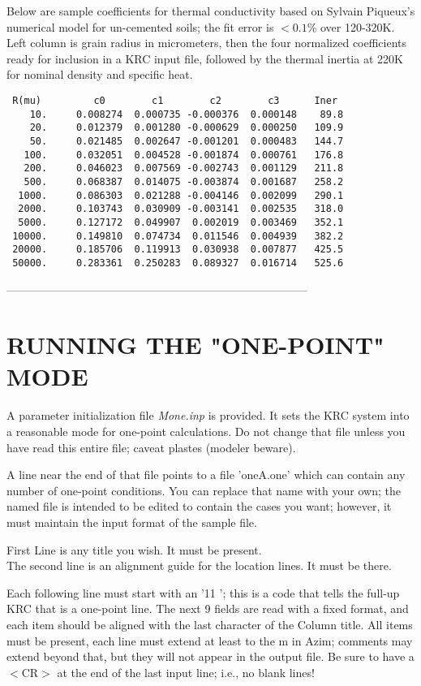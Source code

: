 \documentclass[draft]{article}  %
\newcommand{\nf}{\textit}  %
\begin{document}
Below are sample coefficients for thermal conductivity based on Sylvain
Piqueux's numerical model for un-cemented soils; the fit error is $<0.1$\% over
120-320K. Left column is grain radius in micrometers, then the four normalized
coefficients ready for inclusion in a KRC input file, followed by the thermal
inertia at 220K for nominal density and specific heat.
\vspace{-3.mm} 
\begin{verbatim}
 R(mu)         c0        c1        c2        c3      Iner  
    10.     0.008274  0.000735 -0.000376  0.000148    89.8 
    20.     0.012379  0.001280 -0.000629  0.000250   109.9 
    50.     0.021485  0.002647 -0.001201  0.000483   144.7 
   100.     0.032051  0.004528 -0.001874  0.000761   176.8 
   200.     0.046023  0.007569 -0.002743  0.001129   211.8 
   500.     0.068387  0.014075 -0.003874  0.001687   258.2 
  1000.     0.086303  0.021288 -0.004146  0.002099   290.1 
  2000.     0.103743  0.030909 -0.003141  0.002535   318.0 
  5000.     0.127172  0.049907  0.002019  0.003469   352.1 
 10000.     0.149810  0.074734  0.011546  0.004939   382.2 
 20000.     0.185706  0.119913  0.030938  0.007877   425.5 
 50000.     0.283361  0.250283  0.089327  0.016714   525.6 
\end{verbatim}


--------------------------------------------------------------------------------

 \section{RUNNING THE "ONE-POINT" MODE} %

A parameter initialization file   \nf{Mone.inp}  is provided. It sets the KRC 
system into a reasonable mode for one-point calculations. Do not change that 
file unless you have read this entire file; caveat plastes (modeler beware).

A line near the end of that file points to a file 'oneA.one' which can contain
any number of one-point conditions. You can replace that name with your own; the
named file is intended to be edited to contain the cases you want; however, it
must maintain the input format of the sample file.

First Line is any title you wish. It must be present. \\
The second line is an alignment guide for the location lines. It must be there.

Each following line must start with an '11 '; this is a code that tells the
full-up KRC that is a one-point line. The next 9 fields are read with a fixed
format, and each item should be aligned with the last character of the Column
title. All items must be present, each line must extend at least to the m in
Azim; comments may extend beyond that, but they will not appear in the output
file. Be sure to have a $<$CR$>$ at the end of the last input line; i.e., no
blank lines!
\end{document}

